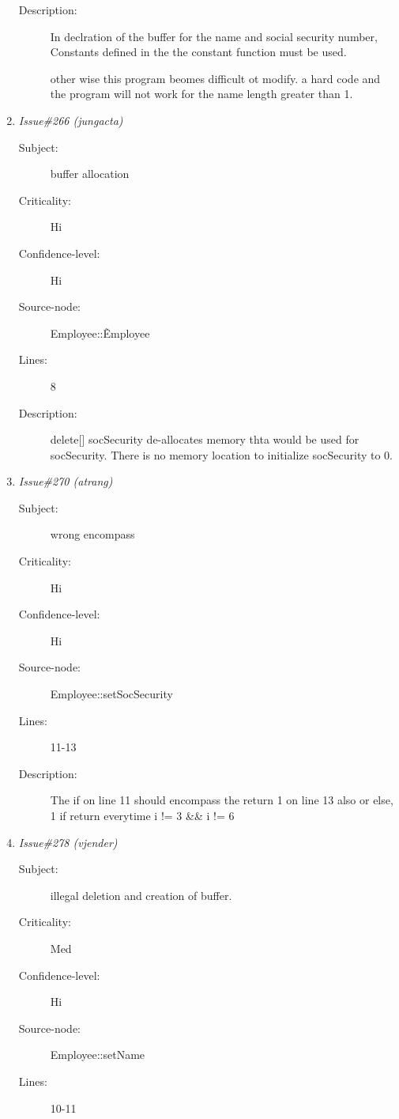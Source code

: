 \begin{enumerate}
\begin{description}
\item [Description:] In declration of the buffer for the name and 
social security number, Constants defined in the the constant function must
be used.

other wise this program beomes difficult ot modify.  a hard code and the
program will not work for the name length greater than 1.
\end{description}
\item {\it Issue\#266 (jungacta)}
\begin{description}
\item [Subject:] buffer allocation
\item [Criticality:] Hi
\item [Confidence-level:] Hi
\item [Source-node:] Employee::\~Employee

\item [Lines:] 8

\item [Description:] delete[] socSecurity de-allocates memory thta
would be used for socSecurity. There is no memory location to initialize
socSecurity to 0.
\end{description}
\item {\it Issue\#270 (atrang)}
\begin{description}
\item [Subject:] wrong encompass
\item [Criticality:] Hi
\item [Confidence-level:] Hi
\item [Source-node:] Employee::setSocSecurity

\item [Lines:] 11-13

\item [Description:] The if on line 11 should encompass the return 1 on line 13 also or else, 1 if
return everytime i != 3 \&\& i != 6
\end{description}
\item {\it Issue\#278 (vjender)}
\begin{description}
\item [Subject:] illegal deletion and creation of buffer.
\item [Criticality:] Med
\item [Confidence-level:] Hi
\item [Source-node:] Employee::setName

\item [Lines:] 10-11


\end{description}
\end{enumerate}
